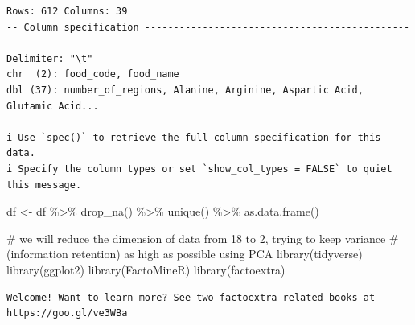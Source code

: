 \documentclass[
  letterpaper,
  DIV=11,
  numbers=noendperiod]{scrartcl}
\newenvironment{Shaded}{\begin{snugshade}}{\end{snugshade}}
\newcommand{\CommentTok}[1]{\textcolor[rgb]{0.37,0.37,0.37}{#1}}
\newcommand{\FunctionTok}[1]{\textcolor[rgb]{0.28,0.35,0.67}{#1}}
\newcommand{\NormalTok}[1]{\textcolor[rgb]{0.00,0.23,0.31}{#1}}
\newcommand{\OtherTok}[1]{\textcolor[rgb]{0.00,0.23,0.31}{#1}}
\newcommand{\SpecialCharTok}[1]{\textcolor[rgb]{0.37,0.37,0.37}{#1}}
\begin{document}
\begin{verbatim}
Rows: 612 Columns: 39
-- Column specification --------------------------------------------------------
Delimiter: "\t"
chr  (2): food_code, food_name
dbl (37): number_of_regions, Alanine, Arginine, Aspartic Acid, Glutamic Acid...

i Use `spec()` to retrieve the full column specification for this data.
i Specify the column types or set `show_col_types = FALSE` to quiet this message.
\end{verbatim}

\begin{Shaded}
\begin{Highlighting}[]
\NormalTok{df }\OtherTok{\textless{}{-}}\NormalTok{ df }\SpecialCharTok{\%\textgreater{}\%}
  \FunctionTok{drop\_na}\NormalTok{() }\SpecialCharTok{\%\textgreater{}\%}
  \FunctionTok{unique}\NormalTok{() }\SpecialCharTok{\%\textgreater{}\%}
  \FunctionTok{as.data.frame}\NormalTok{()}
\end{Highlighting}
\end{Shaded}

\begin{Shaded}
\begin{Highlighting}[]
\CommentTok{\# we will reduce the dimension of data from 18 to 2, trying to keep variance}
\CommentTok{\# (information retention) as high as possible using PCA}
\FunctionTok{library}\NormalTok{(tidyverse)}
\FunctionTok{library}\NormalTok{(ggplot2)}
\FunctionTok{library}\NormalTok{(FactoMineR)}
\FunctionTok{library}\NormalTok{(factoextra)}
\end{Highlighting}
\end{Shaded}

\begin{verbatim}
Welcome! Want to learn more? See two factoextra-related books at https://goo.gl/ve3WBa
\end{verbatim}
\end{document}
